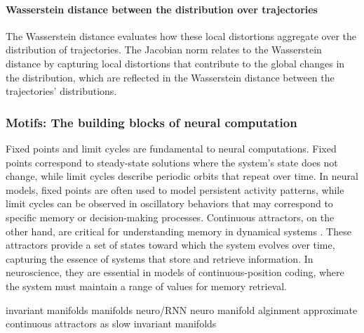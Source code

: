 \documentclass{article}
\theoremstyle{definition} \newtheorem{definition}{Definition}  \newtheorem{example}{Example}
\theoremstyle{remark} \newtheorem{remark}{Remark}
\newcounter{ct}
\begin{document}

\paragraph{Wasserstein distance between the distribution over trajectories}
\citep{bion2019wasserstein}
The Wasserstein distance evaluates how these local distortions aggregate over the distribution of trajectories.
The Jacobian norm relates to the Wasserstein distance by capturing local distortions that contribute to the global changes in the distribution, which are reflected in the Wasserstein distance between the trajectories' distributions.


\subsubsection{Motifs: The building blocks of neural computation}
 Fixed points and limit cycles are fundamental to neural computations.
Fixed points correspond to steady-state solutions where the system’s state does not change, while limit cycles describe periodic orbits that repeat over time.
In neural models, fixed points are often used to model persistent activity patterns, while limit cycles can be observed in oscillatory behaviors that may correspond to specific memory or decision-making processes\citep{machens2005flexible}.
Continuous attractors, on the other hand, are critical for understanding memory in dynamical systems \citep{machens2008ca,darshan2022learning}.
These attractors provide a set of states toward which the system evolves over time, capturing the essence of systems that store and retrieve information.
 In neuroscience, they are essential in models of continuous-position coding, where the system must maintain a range of values for memory retrieval.

invariant manifolds
manifolds neuro/RNN\citep{langdon2023unifying, can2021emergence,cueva2021continuous,gort2024emergence,mishra2021continual,chaudhuri2019attractor, ghazizadeh2021slowmanifold, duncker2021dynamics, pezon2024linking}
neuro \citep{fortunato2024nonlinear}
manifold alginment \citep{kuoch2024probing}
approximate continuous attractors as slow invariant manifolds\citep{Sagodi2024a}
\end{document}
